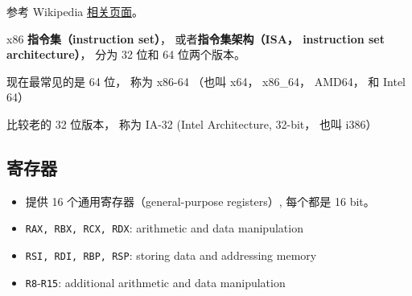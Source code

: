 
\begin{issues}
\issueDraft
\end{issues}

参考 Wikipedia \href{https://en.wikipedia.org/wiki/X86-64}{相关页面}。

x86 \textbf{指令集（instruction set）}， 或者\textbf{指令集架构（ISA， instruction set architecture）}， 分为 32 位和 64 位两个版本。

现在最常见的是 64 位， 称为 x86-64 （也叫 x64， x86_64， AMD64， 和 Intel 64）

比较老的 32 位版本， 称为 IA-32 (Intel Architecture, 32-bit， 也叫 i386）


\subsection{寄存器}
\begin{itemize}
\item 提供 16 个通用寄存器（general-purpose registers）, 每个都是 16 bit。
\item \verb|RAX, RBX, RCX, RDX|: arithmetic and data manipulation
\item \verb|RSI, RDI, RBP, RSP|: storing data and addressing memory
\item \verb|R8|-\verb|R15|: additional arithmetic and data manipulation
\end{itemize}
